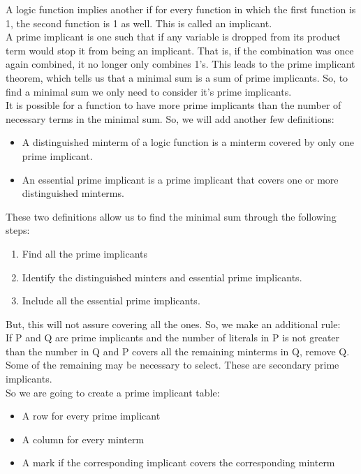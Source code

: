 \documentclass[nobib]{tufte-handout}
\begin{document}
    A logic function implies another if for every function in which the first function is 1, the second function is 1 as well. This is called an implicant.\\
    A prime implicant is one such that if any variable is dropped from its product term would stop it from being an implicant. That is, if the combination was once again combined, it no longer only combines 1's.
    This leads to the prime implicant theorem, which tells us that a minimal sum is a sum of prime implicants. So, to find a minimal sum we only need to consider it's prime implicants.\\
    It is possible for a function to have more prime implicants than the number of necessary terms in the minimal sum. So, we will add another few definitions:\\
    \begin{itemize}
        \item A distinguished minterm of a logic function is a minterm covered by only one
              prime implicant.
        \item An essential prime implicant is a prime implicant that covers one or more
              distinguished minterms.
    \end{itemize}
    These two definitions allow us to find the minimal sum through the following steps:
    \begin{enumerate}
        \item Find all the prime implicants
        \item Identify the distinguished minters and essential prime implicants.
        \item Include all the essential prime implicants.
    \end{enumerate}
    But, this will not assure covering all the ones. So, we make an additional rule:\\
    If P and Q are prime implicants and the number of literals in P is not greater than the number in Q and P covers all the remaining minterms in Q, remove Q.\\
    Some of the remaining may be necessary to select. These are secondary prime implicants.\\
    So we are going to create a prime implicant table:\\
    \begin{itemize}
        \item A row for every prime implicant
        \item A column for every minterm
        \item A mark if the corresponding implicant covers the corresponding minterm
    \end{itemize}
\end{document}
